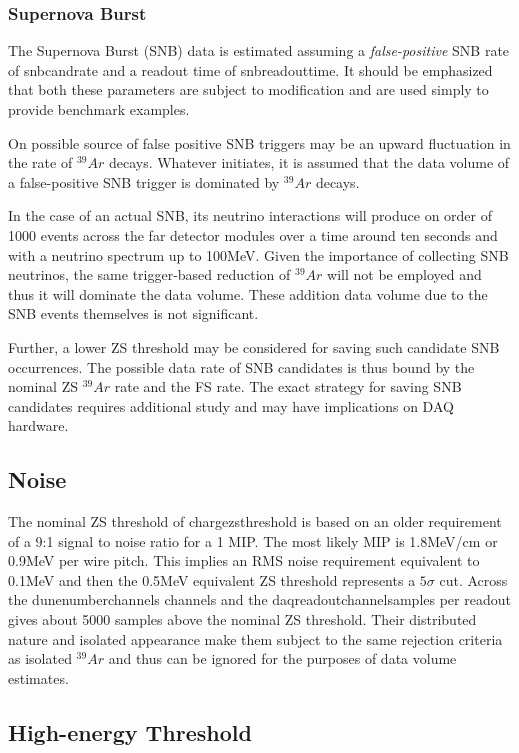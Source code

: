 \subsubsection{Supernova Burst}

The Supernova Burst (SNB) data is estimated assuming a
\textit{false-positive} SNB rate of snbcandrate and a readout time of
snbreadouttime.
It should be emphasized that both these parameters are subject to
modification and are used simply to provide benchmark examples.

On possible source of false positive SNB triggers may be an upward
fluctuation in the rate of $^{39}Ar$ decays.
Whatever initiates, it is assumed that the data volume of a
false-positive SNB trigger is dominated by $^{39}Ar$ decays.

In the case of an actual SNB, its neutrino interactions will produce
on order of 1000 events across the far detector modules over a time
around ten seconds and with a neutrino spectrum up to 100MeV.
Given the importance of collecting SNB neutrinos, the same
trigger-based reduction of $^{39}Ar$ will not be employed and thus it
will dominate the data volume.
These addition data volume due to the SNB events themselves is not
significant.

Further, a lower ZS threshold may be considered for saving such
candidate SNB occurrences.
The possible data rate of SNB candidates is thus bound by the nominal
ZS $^{39}Ar$ rate and the FS rate.
The exact strategy for saving SNB candidates requires additional study
and may have implications on DAQ hardware.

\subsection{Noise}

The nominal ZS threshold of chargezsthreshold is based on an older
requirement of a 9:1 signal to noise ratio for a 1 MIP.
The most likely MIP is 1.8MeV/cm or 0.9MeV per wire pitch.
This implies an RMS noise requirement equivalent to 0.1MeV and
then the 0.5MeV equivalent ZS threshold represents a $5\sigma$ cut.
Across the dunenumberchannels channels and the
daqreadoutchannelsamples per readout gives about 5000 samples
above the nominal ZS threshold.
Their distributed nature and isolated appearance make them subject to
the same rejection criteria as isolated $^{39}Ar$ and thus can be
ignored for the purposes of data volume estimates.


\subsection{High-energy Threshold}

